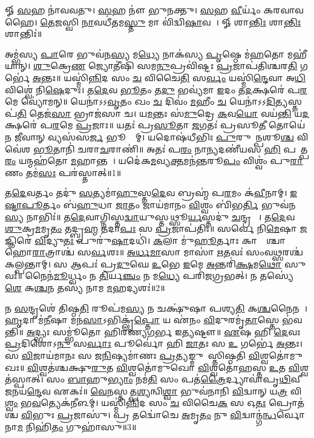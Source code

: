 \setcounter{anuvakam}{0}
𑍐 \ul{𑌸}𑌹 𑌨𑌾॑𑌵𑌵𑌤𑍁। 
\ul{𑌸}𑌹 𑌨𑍗॑ 𑌭𑍁𑌨𑌕𑍍𑌤𑍁। 
\ul{𑌸}𑌹 \ul{𑌵𑍀}𑌰𑍍𑌯𑌂॑ 𑌕𑌰𑌵𑌾𑌵𑌹𑍈। 
\ul{𑌤𑍇}\ul{𑌜}𑌸𑍍𑌵𑌿 \ul{𑌨𑌾}𑌵𑌧𑍀॑𑌤𑌮\ul{𑌸𑍍𑌤𑍁} 𑌮𑌾 𑌵𑌿॑𑌦𑍍𑌵𑌿\ul{𑌷𑌾}𑌵𑌹𑍈᳚। 
𑍐 𑌶𑌾\ul{𑌨𑍍𑌤𑌿𑌃} 𑌶𑌾\ul{𑌨𑍍𑌤𑌿𑌃} 𑌶𑌾𑌨𑍍𑌤𑌿𑌃॑॥

𑌅𑌮𑍍𑌭॑𑌸𑍍𑌯 \ul{𑌪𑌾}𑌰𑍇 𑌭𑍁𑌵॑𑌨\ul{𑌸𑍍𑌯} 𑌮\ul{𑌧𑍍𑌯𑍇} 𑌨𑌾𑌕॑𑌸𑍍𑌯 \ul{𑌪𑍃}𑌷𑍍𑌠𑍇 𑌮॑\ul{𑌹}𑌤𑍋 𑌮𑌹𑍀॑𑌯𑌾𑌨𑍍। 
\ul{𑌶𑍁}𑌕𑍍𑌰𑍇\ul{𑌣} 𑌜𑍍𑌯𑍋𑌤𑍀॑𑌷𑌿 𑌸𑌮\ul{𑌨𑍁}𑌪𑍍𑌰𑌵𑌿॑𑌷𑍍𑌟𑌃 \ul{𑌪𑍍𑌰}𑌜𑌾𑌪॑𑌤𑌿𑌶𑍍𑌚𑌰\ul{𑌤𑌿} 𑌗𑌰𑍍𑌭𑍇॑ \ul{𑌅}𑌨𑍍𑌤𑌃॥ 
𑌯𑌸𑍍𑌮𑌿॑\ul{𑌨𑍍𑌨𑌿}𑌦 𑌸𑌂 \ul{𑌚} 𑌵𑌿𑌚𑍈\ul{𑌤𑌿} 𑌸\ul{𑌰𑍍𑌵𑌂} 𑌯𑌸𑍍𑌮𑌿॑\ul{𑌨𑍍𑌦𑍇}𑌵𑌾 𑌅\ul{𑌧𑌿} 𑌵𑌿𑌶𑍍𑌵𑍇॑ 𑌨𑌿\ul{𑌷𑍇}𑌦𑍁𑌃। 
𑌤\ul{𑌦𑍇}𑌵 \ul{𑌭𑍂}𑌤𑌂 𑌤\ul{𑌦𑍁} 𑌭𑌵𑍍𑌯॑𑌮𑌾 \ul{𑌇}𑌦𑌂 𑌤\ul{𑌦}𑌕𑍍𑌷𑌰𑍇॑ 𑌪\ul{𑌰}𑌮𑍇 𑌵𑍍𑌯𑍋॑𑌮𑌨𑍍॥ 
𑌯𑍇𑌨𑌾॑𑌽𑌽\ul{𑌵𑍃}𑌤𑌂 𑌖𑌂 \ul{𑌚} 𑌦𑌿𑌵𑌂॑ \ul{𑌮}𑌹𑍀𑌂 \ul{𑌚} 𑌯𑍇𑌨𑌾॑𑌽𑌽\ul{𑌦𑌿}𑌤𑍍𑌯𑌸𑍍𑌤𑌪॑\ul{𑌤𑌿} 𑌤𑍇𑌜॑\ul{𑌸𑌾} 𑌭𑍍𑌰𑌾𑌜॑𑌸𑌾 𑌚। 
𑌯\ul{𑌮}𑌨𑍍𑌤𑌃 𑌸॑\ul{𑌮𑍁}𑌦𑍍𑌰𑍇 \ul{𑌕}𑌵\ul{𑌯𑍋} 𑌵𑌯॑\ul{𑌨𑍍𑌤𑌿} 𑌯\ul{𑌦}𑌕𑍍𑌷𑌰𑍇॑ 𑌪\ul{𑌰}𑌮𑍇 \ul{𑌪𑍍𑌰}𑌜𑌾𑌃॥ 
𑌯𑌤𑌃॑ 𑌪𑍍𑌰\ul{𑌸𑍂}𑌤𑌾 \ul{𑌜}𑌗𑌤𑌃॑ 𑌪𑍍𑌰𑌸𑍂\ul{𑌤𑍀} 𑌤𑍋𑌯𑍇॑𑌨 \ul{𑌜𑍀}𑌵𑌾𑌨𑍍 𑌵𑍍𑌯𑌸॑𑌸\ul{𑌰𑍍𑌜} 𑌭𑍂𑌮𑍍𑌯𑌾᳚𑌮𑍍। 
𑌯𑌦𑍋𑌷॑𑌧𑍀𑌭𑌿𑌃 \ul{𑌪𑍁}𑌰𑍁𑌷𑌾᳚\ul{𑌨𑍍𑌪}𑌶𑍂\ul{𑌶𑍍𑌚} 𑌵𑌿𑌵𑍇॑𑌶 \ul{𑌭𑍂}𑌤𑌾𑌨𑌿॑ 𑌚𑌰𑌾\ul{𑌚}𑌰𑌾𑌣𑌿॑॥ 
𑌅𑌤𑌃॑ 𑌪\ul{𑌰𑌂} 𑌨𑌾\ul{𑌨𑍍𑌯}𑌦𑌣𑍀॑𑌯𑌸 \ul{𑌹𑌿} 𑌪𑌰𑌾᳚𑌤𑍍𑌪\ul{𑌰𑌂} 𑌯𑌨𑍍𑌮𑌹॑𑌤𑍋 \ul{𑌮}𑌹𑌾𑌨𑍍𑌤𑌮𑍍᳚। 
𑌯𑌦𑍇॑𑌕\ul{𑌮}𑌵𑍍𑌯\ul{𑌕𑍍𑌤}𑌮𑌨॑𑌨𑍍𑌤𑌰𑍂\ul{𑌪𑌂} 𑌵𑌿𑌶𑍍𑌵𑌂॑ 𑌪𑍁\ul{𑌰𑌾}𑌣𑌂 𑌤𑌮॑\ul{𑌸𑌃} 𑌪𑌰॑𑌸𑍍𑌤𑌾𑌤𑍍॥1॥

𑌤\ul{𑌦𑍇}𑌵𑌰𑍍𑌤𑌂 𑌤𑌦𑍁॑ \ul{𑌸}𑌤𑍍𑌯𑌮𑌾॑\ul{𑌹𑍁}𑌸𑍍𑌤\ul{𑌦𑍇}𑌵 𑌬𑍍𑌰𑌹𑍍𑌮॑ 𑌪\ul{𑌰}𑌮𑌂 𑌕॑\ul{𑌵𑍀}𑌨𑌾𑌮𑍍। 
\ul{𑌇}\ul{𑌷𑍍𑌟𑌾}\ul{𑌪𑍂}𑌰𑍍𑌤𑌂 𑌬॑\ul{𑌹𑍁}𑌧𑌾 \ul{𑌜𑌾}𑌤𑌂 𑌜𑌾𑌯॑𑌮𑌾𑌨𑌂 \ul{𑌵𑌿}𑌶𑍍𑌵𑌂 𑌬𑌿॑𑌭\ul{𑌰𑍍𑌤𑌿} 𑌭𑍁𑌵॑𑌨\ul{𑌸𑍍𑌯} 𑌨𑌾𑌭𑌿𑌃॑॥ 
𑌤\ul{𑌦𑍇}𑌵𑌾𑌗𑍍𑌨𑌿𑌸𑍍𑌤\ul{𑌦𑍍𑌵𑌾}𑌯𑍁𑌸𑍍𑌤𑌥𑍍𑌸𑍂\ul{𑌰𑍍𑌯}𑌸𑍍𑌤𑌦𑍁॑ \ul{𑌚}𑌨𑍍𑌦𑍍𑌰𑌮𑌾𑌃᳚। 
𑌤\ul{𑌦𑍇}𑌵 \ul{𑌶𑍁}𑌕𑍍𑌰\ul{𑌮}𑌮𑍃\ul{𑌤𑌂} 𑌤𑌦𑍍𑌬𑍍𑌰\ul{𑌹𑍍𑌮} 𑌤𑌦𑌾\ul{𑌪𑌃} 𑌸 \ul{𑌪𑍍𑌰}𑌜𑌾𑌪॑𑌤𑌿𑌃॥ 
𑌸𑌰𑍍𑌵𑍇॑ 𑌨𑌿\ul{𑌮𑍇}𑌷𑌾 \ul{𑌜}𑌜𑍍𑌞𑌿𑌰𑍇॑ \ul{𑌵𑌿}𑌦𑍍𑌯𑍁\ul{𑌤𑌃} 𑌪𑍁𑌰𑍁॑\ul{𑌷𑌾}𑌦𑌧𑌿॑। 
\ul{𑌕}𑌲𑌾 𑌮𑍁॑\ul{𑌹𑍂}𑌰𑍍𑌤𑌾𑌃 𑌕𑌾𑌷𑍍𑌠𑌾᳚𑌶𑍍𑌚𑌾𑌹𑍋\ul{𑌰𑌾}𑌤𑍍𑌰𑌾𑌶𑍍𑌚॑ 𑌸\ul{𑌰𑍍𑌵}𑌶𑌃॥ 
\ul{𑌅}\ul{𑌰𑍍𑌧}\ul{𑌮𑌾}𑌸𑌾 𑌮𑌾𑌸𑌾॑ \ul{𑌋}𑌤𑌵𑌃॑ 𑌸𑌂𑌵\ul{𑌥𑍍𑌸}𑌰𑌶𑍍𑌚॑ 𑌕𑌲𑍍𑌪𑌨𑍍𑌤𑌾𑌮𑍍। 
𑌸 𑌆𑌪𑌃॑ 𑌪𑍍𑌰\ul{𑌦𑍁}𑌘𑍇 \ul{𑌉}𑌭𑍇 \ul{𑌇}𑌮𑍇 \ul{𑌅}𑌨𑍍𑌤𑌰𑌿॑\ul{𑌕𑍍𑌷}𑌮\ul{𑌥𑍋} 𑌸𑍁𑌵𑌃॑॥ 
𑌨𑍈𑌨॑\ul{𑌮𑍂}𑌰𑍍𑌧𑍍𑌵𑌂 𑌨 \ul{𑌤𑌿}𑌰𑍍𑌯\ul{𑌞𑍍𑌚𑌂} 𑌨 𑌮\ul{𑌧𑍍𑌯𑍇} 𑌪𑌰𑌿॑𑌜𑌗𑍍𑌰𑌭𑌤𑍍। 
𑌨 𑌤𑌸𑍍𑌯𑍇॑\ul{𑌶𑍇} 𑌕\ul{𑌶𑍍𑌚}𑌨 𑌤𑌸𑍍𑌯॑ 𑌨𑌾𑌮 \ul{𑌮}𑌹𑌦𑍍𑌯𑌶𑌃॑॥2॥

𑌨 \ul{𑌸}𑌨𑍍𑌦𑍃𑌶𑍇॑ 𑌤𑌿𑌷𑍍𑌠\ul{𑌤𑌿} 𑌰𑍂𑌪॑𑌮\ul{𑌸𑍍𑌯} 𑌨 𑌚𑌕𑍍𑌷𑍁॑𑌷𑌾 𑌪𑌶𑍍𑌯\ul{𑌤𑌿} 𑌕\ul{𑌶𑍍𑌚}𑌨𑍈𑌨𑌮𑍍᳚। 
\ul{𑌹𑍃}𑌦𑌾 𑌮॑\ul{𑌨𑍀}𑌷𑌾 𑌮𑌨॑\ul{𑌸𑌾}𑌽𑌭𑌿𑌕𑍍𑌲𑍃॑\ul{𑌪𑍍𑌤𑍋} 𑌯 𑌏॑𑌨𑌂 \ul{𑌵𑌿}𑌦𑍁𑌰𑌮𑍃॑\ul{𑌤𑌾}𑌸𑍍𑌤𑍇 𑌭॑𑌵𑌨𑍍𑌤𑌿॥ 
\ul{𑌅}𑌦𑍍𑌭𑍍𑌯𑌃 𑌸𑌮𑍍𑌭𑍂॑𑌤𑍋 𑌹𑌿𑌰𑌣𑍍𑌯\ul{𑌗}𑌰𑍍𑌭 𑌇\ul{𑌤𑍍𑌯}𑌷𑍍𑌟𑍗॥ 
\ul{𑌏}𑌷 𑌹𑌿 \ul{𑌦𑍇}𑌵𑌃 \ul{𑌪𑍍𑌰}𑌦𑌿𑌶𑍋𑌽\ul{𑌨𑍁} 𑌸\ul{𑌰𑍍𑌵𑌾𑌃} 𑌪𑍂𑌰𑍍𑌵𑍋॑ 𑌹𑌿 \ul{𑌜𑌾}𑌤𑌃 𑌸 \ul{𑌉} 𑌗𑌰𑍍𑌭𑍇॑ \ul{𑌅}𑌨𑍍𑌤𑌃। 
𑌸 \ul{𑌵𑌿}𑌜𑌾𑌯॑𑌮𑌾𑌨𑌃 𑌸 𑌜\ul{𑌨𑌿}𑌷𑍍𑌯𑌮𑌾॑𑌣𑌃 \ul{𑌪𑍍𑌰}𑌤𑍍𑌯𑌙𑍍𑌮𑍁𑌖𑌾᳚𑌸𑍍𑌤𑌿𑌷𑍍𑌠𑌤𑌿 \ul{𑌵𑌿}𑌶𑍍𑌵𑌤𑍋॑𑌮𑍁𑌖𑌃॥ 
\ul{𑌵𑌿}𑌶𑍍𑌵𑌤॑𑌶𑍍𑌚𑌕𑍍𑌷𑍁\ul{𑌰𑍁}𑌤 \ul{𑌵𑌿}𑌶𑍍𑌵𑌤𑍋॑𑌮𑍁𑌖𑍋 \ul{𑌵𑌿}𑌶𑍍𑌵𑌤𑍋॑𑌹𑌸𑍍𑌤 \ul{𑌉}𑌤 \ul{𑌵𑌿}𑌶𑍍𑌵𑌤॑𑌸𑍍𑌪𑌾𑌤𑍍। 
𑌸𑌂 \ul{𑌬𑌾}𑌹𑍁\ul{𑌭𑍍𑌯𑌾𑌂} 𑌨𑌮॑\ul{𑌤𑌿} 𑌸𑌂 𑌪𑌤॑\ul{𑌤𑍍𑌰𑍈}𑌰𑍍𑌦𑍍𑌯𑌾𑌵𑌾॑𑌪𑍃\ul{𑌥𑌿}𑌵𑍀 \ul{𑌜}𑌨𑌯॑\ul{𑌨𑍍𑌦𑍇}𑌵 𑌏𑌕𑌃॑॥ 
\ul{𑌵𑍇}𑌨𑌸𑍍𑌤𑌤𑍍𑌪\ul{𑌶𑍍𑌯}𑌨𑍍𑌵𑌿\ul{𑌶𑍍𑌵𑌾} 𑌭𑍁𑌵॑𑌨𑌾𑌨𑌿 \ul{𑌵𑌿}𑌦𑍍𑌵𑌾𑌨𑍍 𑌯\ul{𑌤𑍍𑌰} 𑌵𑌿\ul{𑌶𑍍𑌵𑌂} 𑌭\ul{𑌵}𑌤𑍍𑌯𑍇𑌕॑𑌨𑍀𑌳𑌮𑍍। 
𑌯𑌸𑍍𑌮𑌿॑\ul{𑌨𑍍𑌨𑌿}𑌦 𑌸𑌂 \ul{𑌚} 𑌵𑌿𑌚𑍈\ul{𑌕}\ul{} 𑌸 𑌓\ul{𑌤𑌃} 𑌪𑍍𑌰𑍋𑌤॑𑌶𑍍𑌚 \ul{𑌵𑌿}𑌭𑍁𑌃 \ul{𑌪𑍍𑌰}𑌜𑌾𑌸𑍁॑। 
𑌪𑍍𑌰 𑌤𑌦𑍍𑌵𑍋॑𑌚𑍇 \ul{𑌅}𑌮𑍃\ul{𑌤𑌂} 𑌨𑍁 \ul{𑌵𑌿}𑌦𑍍𑌵𑌾𑌨𑍍𑌗॑\ul{𑌨𑍍𑌧}𑌰𑍍𑌵𑍋 𑌨𑌾\ul{𑌮} 𑌨𑌿𑌹𑌿॑\ul{𑌤𑌂} 𑌗𑍁𑌹𑌾॑𑌸𑍁॥3॥

